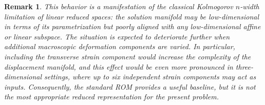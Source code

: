 \documentclass[11pt,a4paper]{article}
\newtheorem{remark}{Remark}
\newcommand{\PROMPT}[1]{ }
\begin{document}
\begin{remark}
This behavior is a manifestation of the classical Kolmogorov $n$-width limitation of linear
reduced spaces: the solution manifold may be low-dimensional in terms of its parametrization
but poorly aligned with any low-dimensional affine or linear subspace. The situation is
expected to deteriorate further when additional macroscopic deformation components are
varied. In particular, including the transverse strain component would increase the
complexity of the displacement manifold, and this effect would be even more pronounced
in three-dimensional settings, where up to six independent strain components may act as
inputs. Consequently, the standard ROM provides a useful baseline, but it is not the most appropriate
reduced representation for the present problem.
\end{remark}


%
\end{document}
